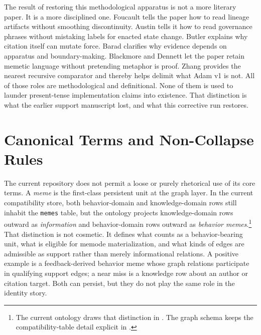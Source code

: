 \documentclass[10pt]{article}
\begin{document}
The result of restoring this methodological apparatus is not a more literary paper. It is a more disciplined one. Foucault tells the paper how to read lineage artifacts without smoothing discontinuity. Austin tells it how to read governance phrases without mistaking labels for enacted state change. Butler explains why citation itself can mutate force. Barad clarifies why evidence depends on apparatus and boundary-making. Blackmore and Dennett let the paper retain memetic language without pretending metaphor is proof. Zhang provides the nearest recursive comparator and thereby helps delimit what Adam v1 is not. All of those roles are methodological and definitional. None of them is used to launder present-tense implementation claims into existence. That distinction is what the earlier support manuscript lost, and what this corrective run restores.

\section{Canonical Terms and Non-Collapse Rules}

The current repository does not permit a loose or purely rhetorical use of its core terms. A \emph{meme} is the first-class persistent unit at the graph layer. In the current compatibility store, both behavior-domain and knowledge-domain rows still inhabit the \texttt{memes} table, but the ontology projects knowledge-domain rows outward as \emph{information} and behavior-domain rows outward as \emph{behavior memes}.\footnote{The current ontology draws that distinction in . The graph schema keeps the compatibility-table detail explicit in .} That distinction is not cosmetic. It defines what counts as a behavior-bearing unit, what is eligible for memode materialization, and what kinds of edges are admissible as support rather than merely informational relations. A positive example is a feedback-derived behavior meme whose graph relations participate in qualifying support edges; a near miss is a knowledge row about an author or citation target. Both can persist, but they do not play the same role in the identity story.
\end{document}
